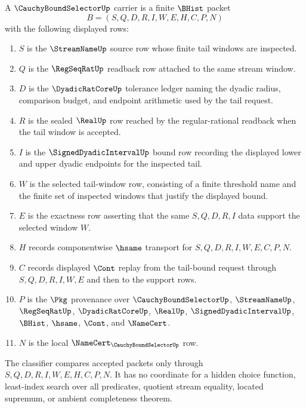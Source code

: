 \begin{definition}
\label{def:cauchy-bound-selector-carrier}
A $\CauchyBoundSelectorUp$ carrier is a finite $\BHist$ packet
$$
B=(S,Q,D,R,I,W,E,H,C,P,N)
$$
with the following displayed rows:
\begin{enumerate}
\item $S$ is the $\StreamNameUp$ source row whose finite tail windows are inspected.
\item $Q$ is the $\RegSeqRatUp$ readback row attached to the same stream window.
\item $D$ is the $\DyadicRatCoreUp$ tolerance ledger naming the dyadic radius, comparison budget, and endpoint arithmetic used by the tail request.
\item $R$ is the sealed $\RealUp$ row reached by the regular-rational readback when the tail window is accepted.
\item $I$ is the $\SignedDyadicIntervalUp$ bound row recording the displayed lower and upper dyadic endpoints for the inspected tail.
\item $W$ is the selected tail-window row, consisting of a finite threshold name and the finite set of inspected windows that justify the displayed bound.
\item $E$ is the exactness row asserting that the same $S,Q,D,R,I$ data support the selected window $W$.
\item $H$ records componentwise $\hsame$ transport for $S,Q,D,R,I,W,E,C,P,N$.
\item $C$ records displayed $\Cont$ replay from the tail-bound request through $S,Q,D,R,I,W,E$ and then to the support rows.
\item $P$ is the $\Pkg$ provenance over $\CauchyBoundSelectorUp$, $\StreamNameUp$, $\RegSeqRatUp$, $\DyadicRatCoreUp$, $\RealUp$, $\SignedDyadicIntervalUp$, $\BHist$, $\hsame$, $\Cont$, and $\NameCert$.
\item $N$ is the local $\NameCert_{\CauchyBoundSelectorUp}$ row.
\end{enumerate}
The classifier compares accepted packets only through $S,Q,D,R,I,W,E,H,C,P,N$. It has no coordinate for a hidden choice function, least-index search over all predicates, quotient stream equality, located supremum, or ambient completeness theorem.
\end{definition}

